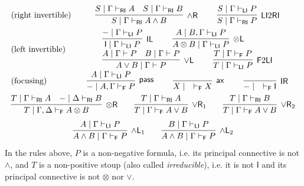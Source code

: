 \documentclass[submission,copyright,creativecommons]{eptcs}
\theoremstyle{definition}
\newcommand{\tl}{\otimes \mathsf{L}}
\newcommand{\tr}{\otimes \mathsf{R}}
\newcommand{\pass}{\mathsf{pass}}
\newcommand{\unitl}{\mathsf{IL}}
\newcommand{\unitr}{\mathsf{IR}}
\newcommand{\andlone}{\land \mathsf{L}_{1}}
\newcommand{\andltwo}{\land \mathsf{L}_{2}}
\newcommand{\andr}{\land \mathsf{R}}
\newcommand{\orl}{\lor \mathsf{L}}
\newcommand{\orrone}{\lor \mathsf{R}_{1}}
\newcommand{\orrtwo}{\lor \mathsf{R}_{2}}
\newcommand{\ax}{\mathsf{ax}}
\newcommand{\ot}{\otimes}
\newcommand{\I}{\mathsf{I}}
\newcommand{\RI}{\mathsf{RI}}
\newcommand{\LI}{\mathsf{LI}}
\newcommand{\F}{\mathsf{F}}
\newcommand{\proofbox}[1]{\begin{tabular}{l} #1 \end{tabular}}
\newcommand\niccolo[1]{\mbox{}
{\marginpar{\color{red}NV}}
{\sf\noindent\color{red}#1}}%
\begin{document}
\begin{equation}\label{eq:naive:focus}
  \begin{array}{lc}
    \text{(right invertible)} & %
    \proofbox{
      \infer[\andr]{S \mid \Gamma \vdash_{\RI} A \land B}{
        S \mid \Gamma \vdash_{\RI} A
        &
        S \mid \Gamma \vdash_{\RI} B
      }
    \qquad
    \infer[\LI 2 \RI]{S \mid \Gamma \vdash_{\RI} P}{S \mid \Gamma \vdash_{\LI} P}
    }
    \\[10pt]
    \text{(left invertible)} & %
    \proofbox{
      \infer[\unitl]{\I \mid \Gamma \vdash_{\LI} P}{{-} \mid \Gamma \vdash_{\LI} P}
    \qquad
    \infer[\tl]{A \ot B \mid \Gamma \vdash_{\LI} P}{A \mid B , \Gamma \vdash_{\LI} P}
    \\
    \infer[\orl]{A \lor B \mid \Gamma \vdash P}{
      A \mid \Gamma \vdash P
      &
      B \mid \Gamma \vdash P
    }
    \qquad
    \infer[\F 2 \LI]{T \mid \Gamma \vdash_{\LI} P}{T \mid \Gamma \vdash_{\F} P}
    }
    \\[10pt]
    \text{(focusing)} &    %
    \proofbox{
    \infer[\pass]{{-} \mid A , \Gamma \vdash_{\F} P }{
        A \mid \Gamma \vdash_{\LI} P
    }
    \qquad
    \infer[\ax]{X \mid \quad \vdash_{\F} X}{}
    \qquad
    \infer[\unitr]{{-} \mid \quad \vdash_{\F} \I}{}
    }
    \\[10pt]
    \multicolumn{2}{c}{
    \infer[\tr]{T \mid \Gamma , \Delta \vdash_{\F} A \ot B}{
      T \mid \Gamma \vdash_{\RI} A
      &
      {-} \mid \Delta \vdash_{\RI} B
    }
    \qquad
    \infer[\orrone]{T \mid \Gamma \vdash_{\F} A \lor B}{
      T \mid \Gamma \vdash_{\RI} A
    }
    \qquad
    \infer[\orrtwo]{T \mid \Gamma \vdash_{\F} A \lor B}{
      T \mid \Gamma \vdash_{\RI} B
    }
    }
    \\[6pt]
    \multicolumn{2}{c}{
    \infer[\andlone]{A \land B \mid \Gamma \vdash_{\F} P}{A \mid \Gamma \vdash_{\LI} P}
    \qquad
    \infer[\andltwo]{A \land B \mid \Gamma \vdash_{\F} P}{B \mid \Gamma \vdash_{\LI} P}
    }
  \end{array}
\end{equation}
In the rules above, $P$ is a non-negative formula, i.e. its principal connective is not $\land$, and $T$ is a non-positive stoup (also called \emph{irreducible}), i.e. it is not $\I$ and its principal connective is not $\ot$ nor $\lor$.
\end{document}
